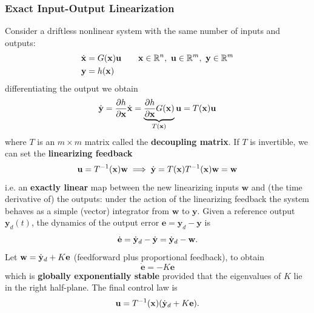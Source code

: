 \documentclass[10pt, a4paper]{report}
\newcommand{\y}{{\mathbf y}}
\begin{document}
\subsubsection*{Exact Input-Output Linearization}
Consider a driftless nonlinear system with the same number of inputs and outputs:\begin{align}
    \dot{\mathbf x}&=G(\mathbf x)\mathbf u\qquad \mathbf x\in\R^n,\ \mathbf u\in\R^m,\ \y\in\R^m\\
    \y&=h(\mathbf x)
\end{align}
differentiating the output we obtain\begin{equation}
    {\dot{\mathbf y}}=\frac{\partial h}{\partial\mathbf x}\dot{\mathbf x}=\underbrace{\frac{\partial h}{\partial\mathbf x}G(\mathbf x)}_{T(\mathbf x)}\mathbf u=T(\mathbf x)\mathbf u
\end{equation}
where $T$ is an $m\times m$ matrix called the \textbf{decoupling matrix}. If $T$ is invertible, we can set the \textbf{linearizing feedback}\begin{equation}
    \mathbf u=T^{-1}(\mathbf x)\mathbf w\implies{\dot{\mathbf y}}=T(\mathbf x)T^{-1}(\mathbf x)\mathbf w=\mathbf w
\end{equation}
i.e. an \textbf{exactly linear} map between the new linearizing inputs $\mathbf w$ and (the time derivative of) the outputs: under the action of the linearizing feedback the system behaves as a simple (vector) integrator from $\mathbf w$ to $\y$. Given a reference output $\y_d(t)$, the dynamics of the output error $\mathbf e=\y_d-\y$ is\begin{equation}
    \dot{\mathbf e}={\dot{\mathbf y}}_d-{\dot{\mathbf y}}={\dot{\mathbf y}}_d-\mathbf w.
\end{equation}
Let $\mathbf w={\dot{\mathbf y}}_d+K\mathbf e$ (feedforward plus proportional feedback), to obtain\begin{equation}
    \dot{\mathbf e}=-K\mathbf e
\end{equation}
which is \textbf{globally exponentially stable} provided that the eigenvalues of $K$ lie in the right half-plane. The final control law is\begin{equation}
    \mathbf u=T^{-1}(\mathbf x)({\dot{\mathbf y}}_d+K\mathbf e).
\end{equation}
\end{document}
